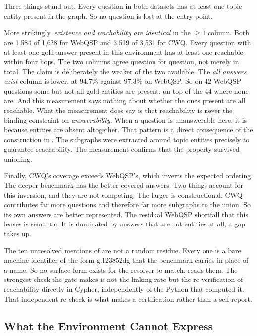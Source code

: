 Three things stand out. Every question in both datasets has at least one topic
entity present in the graph. So no question is lost at the entry point.

More strikingly, \emph{existence and reachability are identical} in the $\geq 1$
column. Both are 1{,}584 of 1{,}628 for WebQSP and 3{,}519 of 3{,}531 for CWQ.
Every question with at least one gold answer present in this environment has at
least one reachable within four hops. The two columns agree question for
question, not merely in total. The claim is deliberately the weaker of the two
available. The \emph{all answers exist} column is lower, at $94.7\%$ against
$97.3\%$ on WebQSP. So on $42$ WebQSP questions some but not all gold entities
are present, on top of the $44$ where none are. And this measurement says
nothing about whether the ones present are all reachable. What the measurement
does say is that reachability is never the binding constraint on
\emph{answerability}. When a question is unanswerable here, it is because
entities are absent altogether. That pattern is a direct consequence of the
construction in . The subgraphs were extracted
around topic entities precisely to guarantee reachability. The measurement
confirms that the property survived unioning.

Finally, CWQ's coverage exceeds WebQSP's, which inverts the expected ordering.
The deeper benchmark has the better-covered answers. Two things account for this
inversion, and they are not competing. The larger is constructional. CWQ
contributes far more questions and therefore far more subgraphs to the union. So
its own answers are better represented. The residual WebQSP shortfall that this
leaves is semantic. It is dominated by answers that are not entities at all, a
gap  takes up.

The ten unresolved mentions of  are not a random residue.
Every one is a bare machine identifier of the form \textsf{g.123852dg} that the
benchmark carries in place of a name. So no surface form exists for the resolver
to match.  reads them. The strongest check the gate
makes is not the linking rate but the re-verification of reachability directly
in Cypher, independently of the Python that computed it. That independent
re-check is what makes  a certification rather than a
self-report.

\subsection{What the Environment Cannot Express}\label{sec:unanswerable}

